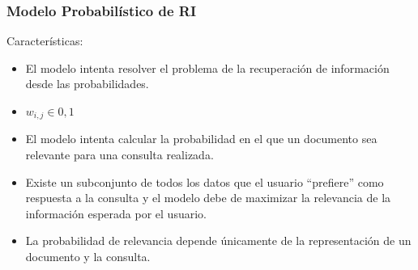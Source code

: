 \documentclass[
10pt, %
aspectratio=169, %
]{beamer}
\begin{document}
	\begin{frame}
		
		\frametitle{Modelo Probabilístico de RI}
		
		Características:
		\begin{itemize}
			
			\item El modelo intenta resolver el problema de la recuperación de información desde las probabilidades. \\[2mm]
			
			\item $w_{i, j} \in {0, 1}$ \\[2mm]
			
			\item El modelo intenta calcular la probabilidad en el que un documento sea relevante para una consulta realizada.
			
			\item Existe un subconjunto de todos los datos que el usuario ``prefiere'' como respuesta a la consulta y el modelo debe de maximizar la relevancia de la información esperada por el usuario. \\[2mm]
			
			\item La probabilidad de relevancia depende únicamente de la representación de un documento y la consulta. 
			
		\end{itemize}
		
	\end{frame}
	
\end{document}
